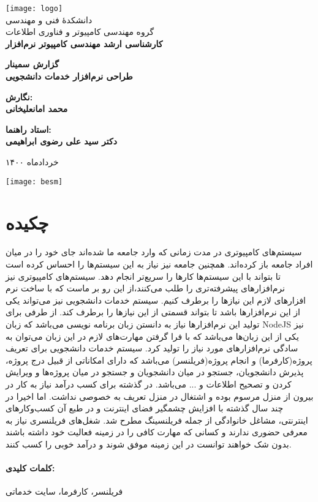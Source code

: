 
\begin{titlepage}
	\centering
	\texttt{[image: logo]}
	\\[10pt]
	{\Large
		دانشکدۀ ‫فنی و مهندسی
		\\[10pt]
		گروه ‫مهندسی کامپیوتر و فناوری اطلاعات
		\\[15pt] \bfseries
		کارشناسی ارشد مهندسی کامپیوتر نرم‌افزار
	‬‫‬‬}

	\vfill
	{\Large \bfseries
		گزارش سمینار
	} \\[10pt]
	{\huge	\bfseries
			 طراحی نرم‌افزار خدمات دانشجویی
	}

	\vfill
	{\large \bfseries
	نگارش:
	\\[10pt]
	محمد  امانعلیخانی
	}

	\vfill
	{\large \bfseries
			استاد راهنما:
			\\[10pt]
			دکتر سید علی رضوی ابراهیمی
	}

	\vfill
	{\large خرداد‌ماه ۱۴۰۰}



\end{titlepage}


\thispagestyle{empty}
\begin{minipage}[c][\textheight][c]{\textwidth}%
	\centering
	\texttt{[image: besm]}
\end{minipage}%

\section*{چکیده}
سیستم‌های کامپیوتری در مدت زمانی که وارد جامعه ما شده‌اند جای خود را در میان افراد جامعه باز کرده‌اند.
همچنین جامعه نیز نیاز به این سیستم‌ها را احساس کرده است تا بتواند با این  سیستم‌ها  کارها را سریع‌تر انجام دهد.
سیستم‌های کامپیوتری نیز نرم‌افزارهای پیشرفته‌تری را طلب می‌کنند،از این رو بر ماست که با ساخت نرم افزارهای لازم این نیازها را برطرف کنیم.
سیستم خدمات دانشجویی نیز می‌تواند یکی از این نرم‌افزارها باشد تا بتواند قسمتی از این نیازها را برطرف کند.
از طرفی برای تولید این نرم‌افزارها نیاز به دانستن زبان‌ برنامه نویسی می‌باشد که زبان NodeJS نیز یکی از این زبان‌ها می‌باشد که با فرا گرفتن مهارت‌های لازم در این زبان می‌توان به سادگی نرم‌افزارهای مورد نیاز را تولید کرد.
سیستم خدمات دانشجویی برای تعریف پروژه(کارفرما) و انجام پروژه(فریلنسر) می‌باشد که دارای امکاناتی از قبیل درج پروژه، پذیرش دانشجویان، جستجو در میان دانشجویان و جستجو در میان پروژه‌ها و ویرایش کردن و تصحیح اطلاعات و ... می‌باشد.
در گذشته برای کسب درآمد نیاز به کار در بیرون از منزل مرسوم بوده و اشتغال در منزل تعریف به خصوصی نداشت.
اما اخیرا در چند سال گذشته با افزایش چشمگیر فضای اینترنت و در طبع آن کسب‌وکارهای اینترنتی، مشاغل خانوادگی از جمله فریلنسینگ مطرح شد.
شغل‌های فریلنسری نیاز به معرفی حضوری ندارند و کسانی که مهارت کافی را در زمینه فعالیت خود داشته باشند بدون شک خواهند توانست در این زمینه موفق شوند و درآمد خوبی را کسب کنند.
\paragraph{کلمات کلیدی:}
فریلنسر، کارفرما، سایت خدماتی

\thispagestyle{empty}
\pagestyle{plain}
\setcounter{page}{1}
\clearpage










